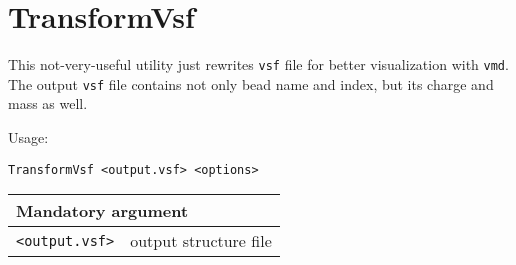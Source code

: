 \section{TransformVsf} \label{sec:TransformVsf}

This not-very-useful utility just rewrites \texttt{vsf} file for better
visualization with \texttt{vmd}. The output \texttt{vsf} file contains not
only bead name and index, but its charge and mass as well.

Usage:

\vspace{1em}
\noindent
\texttt{TransformVsf <output.vsf> <options>}

\vspace{1em}
\noindent
\begin{longtable}{p{}p{}}
  \toprule
  \multicolumn{2}{l}{Mandatory argument} \\
  \midrule
  \texttt{<output.vsf>} & output structure file \\
  \bottomrule
\end{longtable}

